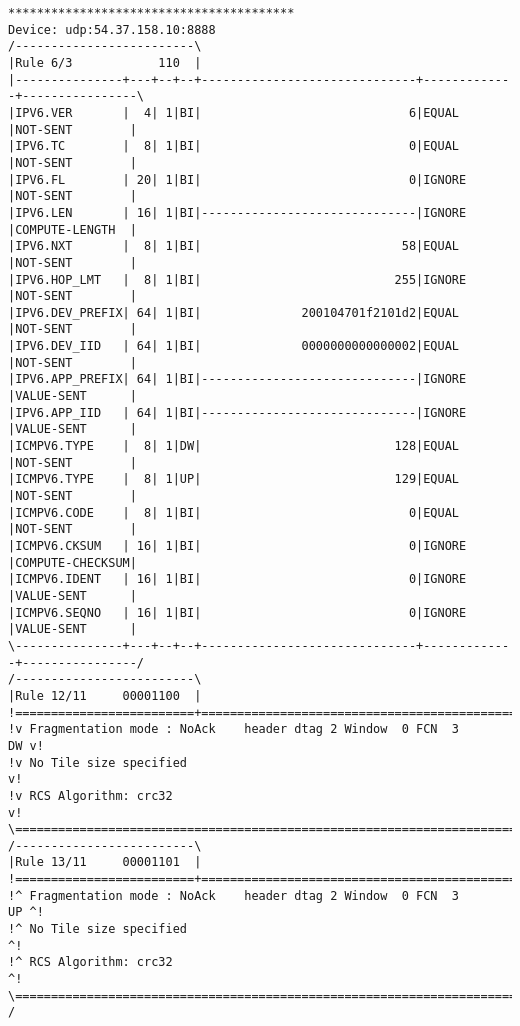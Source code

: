 \begin{lstlisting}[basicstyle=\ttfamily\scriptsize, numbers=none]
****************************************
Device: udp:54.37.158.10:8888
/-------------------------\
|Rule 6/3            110  |
|---------------+---+--+--+------------------------------+-------------+----------------\
|IPV6.VER       |  4| 1|BI|                             6|EQUAL        |NOT-SENT        |
|IPV6.TC        |  8| 1|BI|                             0|EQUAL        |NOT-SENT        |
|IPV6.FL        | 20| 1|BI|                             0|IGNORE       |NOT-SENT        |
|IPV6.LEN       | 16| 1|BI|------------------------------|IGNORE       |COMPUTE-LENGTH  |
|IPV6.NXT       |  8| 1|BI|                            58|EQUAL        |NOT-SENT        |
|IPV6.HOP_LMT   |  8| 1|BI|                           255|IGNORE       |NOT-SENT        |
|IPV6.DEV_PREFIX| 64| 1|BI|              200104701f2101d2|EQUAL        |NOT-SENT        |
|IPV6.DEV_IID   | 64| 1|BI|              0000000000000002|EQUAL        |NOT-SENT        |
|IPV6.APP_PREFIX| 64| 1|BI|------------------------------|IGNORE       |VALUE-SENT      |
|IPV6.APP_IID   | 64| 1|BI|------------------------------|IGNORE       |VALUE-SENT      |
|ICMPV6.TYPE    |  8| 1|DW|                           128|EQUAL        |NOT-SENT        |
|ICMPV6.TYPE    |  8| 1|UP|                           129|EQUAL        |NOT-SENT        |
|ICMPV6.CODE    |  8| 1|BI|                             0|EQUAL        |NOT-SENT        |
|ICMPV6.CKSUM   | 16| 1|BI|                             0|IGNORE       |COMPUTE-CHECKSUM|
|ICMPV6.IDENT   | 16| 1|BI|                             0|IGNORE       |VALUE-SENT      |
|ICMPV6.SEQNO   | 16| 1|BI|                             0|IGNORE       |VALUE-SENT      |
\---------------+---+--+--+------------------------------+-------------+----------------/
/-------------------------\
|Rule 12/11     00001100  |
!=========================+=============================================================\
!v Fragmentation mode : NoAck    header dtag 2 Window  0 FCN  3                     DW v!
!v No Tile size specified                                                              v!
!v RCS Algorithm: crc32                                                                v!
\=======================================================================================/
/-------------------------\
|Rule 13/11     00001101  |
!=========================+=============================================================\
!^ Fragmentation mode : NoAck    header dtag 2 Window  0 FCN  3                     UP ^!
!^ No Tile size specified                                                              ^!
!^ RCS Algorithm: crc32                                                                ^!
\=======================================================================================/
/
\end{lstlisting}